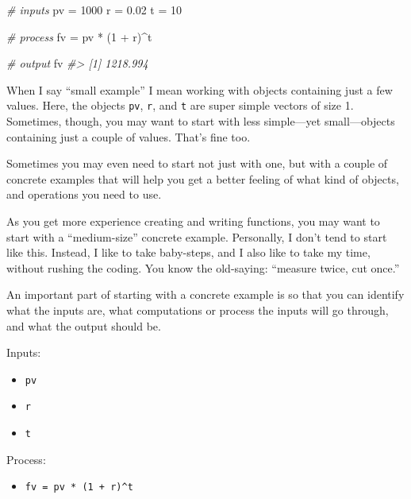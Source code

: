 \documentclass[
]{book}
\newenvironment{Shaded}{\begin{snugshade}}{\end{snugshade}}
\newcommand{\CommentTok}[1]{\textcolor[rgb]{0.56,0.35,0.01}{\textit{#1}}}
\newcommand{\DecValTok}[1]{\textcolor[rgb]{0.00,0.00,0.81}{#1}}
\newcommand{\FloatTok}[1]{\textcolor[rgb]{0.00,0.00,0.81}{#1}}
\newcommand{\NormalTok}[1]{#1}
\newcommand{\OtherTok}[1]{\textcolor[rgb]{0.56,0.35,0.01}{#1}}
\newcommand{\SpecialCharTok}[1]{\textcolor[rgb]{0.00,0.00,0.00}{#1}}
\providecommand{\tightlist}{%
  \setlength{\itemsep}{0pt}\setlength{\parskip}{0pt}}
\begin{document}
\begin{Shaded}
\begin{Highlighting}[]
\CommentTok{\# inputs}
\NormalTok{pv }\OtherTok{=} \DecValTok{1000}
\NormalTok{r }\OtherTok{=} \FloatTok{0.02}
\NormalTok{t }\OtherTok{=} \DecValTok{10}

\CommentTok{\# process}
\NormalTok{fv }\OtherTok{=}\NormalTok{ pv }\SpecialCharTok{*}\NormalTok{ (}\DecValTok{1} \SpecialCharTok{+}\NormalTok{ r)}\SpecialCharTok{\^{}}\NormalTok{t}

\CommentTok{\# output}
\NormalTok{fv}
\CommentTok{\#\textgreater{} [1] 1218.994}
\end{Highlighting}
\end{Shaded}

When I say ``small example'' I mean working with objects containing just a few
values. Here, the objects \texttt{pv}, \texttt{r}, and \texttt{t} are super simple vectors of size 1.
Sometimes, though, you may want to start with less simple---yet small---objects
containing just a couple of values. That's fine too.

Sometimes you may even need to start not just with one, but with a couple of
concrete examples that will help you get a better feeling of what kind of
objects, and operations you need to use.

As you get more experience creating and writing functions, you may want to
start with a ``medium-size'' concrete example. Personally, I don't tend to start
like this. Instead, I like to take baby-steps, and I also like to take my time,
without rushing the coding. You know the old-saying: ``measure twice, cut once.''

An important part of starting with a concrete example is so that you can
identify what the inputs are, what computations or process the inputs will go through, and what the output should be.

Inputs:

\begin{itemize}
\tightlist
\item
  \texttt{pv}
\item
  \texttt{r}
\item
  \texttt{t}
\end{itemize}

Process:

\begin{itemize}
\tightlist
\item
  \texttt{fv\ =\ pv\ *\ (1\ +\ r)\^{}t}
\end{itemize}
\end{document}
